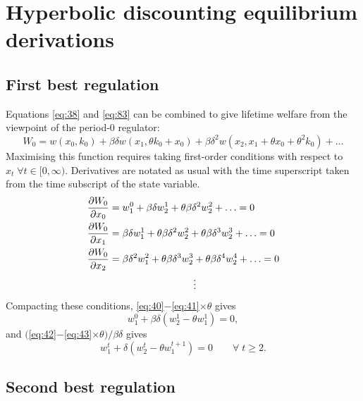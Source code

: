 \chapter[Hyperbolic derivations]{Hyperbolic discounting equilibrium derivations}
\label{cha:hyperb-disc}

\section{First best regulation}
\label{sec:first-best-regul-1}

Equations \eqref{eq:38} and \eqref{eq:83} can be combined to give
lifetime welfare from the viewpoint of the period-$0$ regulator:
\begin{equation}
  \label{eq:39} W_0 = w(x_0,k_0) + \beta\delta w(x_1,\theta k_0+x_0) +
  \beta\delta^2 w(x_2,x_1+\theta x_0+\theta^2 k_0) + \ldots
\end{equation} Maximising this function requires taking first-order conditions
with respect to $x_t \;\forall t\in [0,\infty)$. Derivatives are notated
as usual with the time superscript taken from the time subscript of
the state variable.
\begin{align}
  \label{eq:40} \del{W_0}{x_0} &= w_1^0 + \beta\delta w_2^1 +
  \theta\beta\delta^2 w_2^2 + \ldots = 0 \\
  \label{eq:41} \del{W_0}{x_1}
  &=\beta\delta w_1^1 + \theta\beta\delta^2 w_2^2 + \theta\beta\delta^3
  w_2^3 + \ldots = 0 \\
  \label{eq:42} \del{W_0}{x_2} &=\beta\delta^2 w_1^2 +
  \theta\beta\delta^3 w_2^3 + \theta\beta\delta^4 w_2^4 + \ldots
  = 0 \\
  &\hspace{3cm}\vdots
\end{align} Compacting these conditions,
\eqref{eq:40}$-$\eqref{eq:41}$\times\theta$ gives
\begin{equation}
  \label{eq:43} w^0_1 + \beta\delta \left(w^1_2 - \theta w^1_1 \right)
  = 0,
\end{equation} and $($\eqref{eq:42}$-$\eqref{eq:43}$\times\theta ) /
\beta\delta$ gives
\begin{equation}
  \label{eq:44} w^t_1 + \delta \left(w^t_2 - \theta w^{t+1}_1 \right)
  = 0 \qquad \forall\; t \geq 2.
\end{equation}


\section{Second best regulation}
\label{sec:second-best-regul-1}

